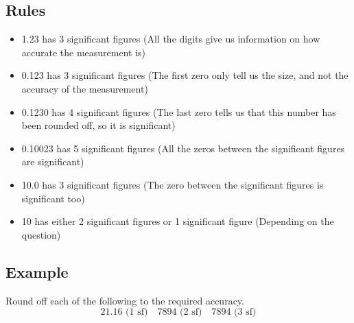 \documentclass[a4paper,12pt]{article}
\begin{document}
\subsection{Rules}
\begin{itemize}
	\item 1.23 has 3 significant figures (All the digits give us information on how accurate the measurement is)
	\item 0.123 has 3 significant figures (The first zero only tell us the size, and not the accuracy of the measurement)
	\item 0.1230 has 4 significant figures (The last zero tells us that this number has been rounded off, so it is significant)
	\item 0.10023 has 5 significant figures (All the zeros between the significant figures are significant)
	\item 10.0 has 3 significant figures (The zero between the significant figures is significant too)
	\item 10 has either 2 significant figures or 1 significant figure (Depending on the question)
\end{itemize}
\subsection{Example}
Round off each of the following to the required accuracy.
\[21.16\text{ (1 sf)}\quad7894\text{ (2 sf)}\quad7894\text{ (3 sf)}\]
\end{document}
